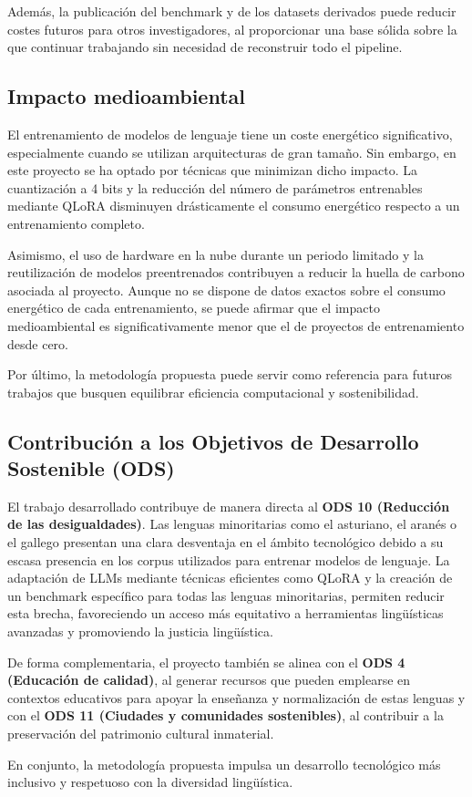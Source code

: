 Además, la publicación del benchmark y de los datasets derivados puede reducir costes futuros para otros investigadores, al proporcionar una base sólida sobre la que continuar trabajando sin necesidad de reconstruir todo el pipeline.

\subsection{Impacto medioambiental}

El entrenamiento de modelos de lenguaje tiene un coste energético significativo, especialmente cuando se utilizan arquitecturas de gran tamaño. Sin embargo, en este proyecto se ha optado por técnicas que minimizan dicho impacto. La cuantización a 4 bits y la reducción del número de parámetros entrenables mediante QLoRA disminuyen drásticamente el consumo energético respecto a un entrenamiento completo.

Asimismo, el uso de hardware en la nube durante un periodo limitado y la reutilización de modelos preentrenados contribuyen a reducir la huella de carbono asociada al proyecto. Aunque no se dispone de datos exactos sobre el consumo energético de cada entrenamiento, se puede afirmar que el impacto medioambiental es significativamente menor que el de proyectos de entrenamiento desde cero.

Por último, la metodología propuesta puede servir como referencia para futuros trabajos que busquen equilibrar eficiencia computacional y sostenibilidad.

\subsection*{Contribución a los Objetivos de Desarrollo Sostenible (ODS)}

El trabajo desarrollado contribuye de manera directa al \textbf{ODS 10 (Reducción de las desigualdades)}. Las lenguas minoritarias como el asturiano, el aranés o el gallego presentan una clara desventaja en el ámbito tecnológico debido a su escasa presencia en los corpus utilizados para entrenar modelos de lenguaje. La adaptación de LLMs mediante técnicas eficientes como QLoRA y la creación de un benchmark específico para todas las lenguas minoritarias, permiten reducir esta brecha, favoreciendo un acceso más equitativo a herramientas lingüísticas avanzadas y promoviendo la justicia lingüística.

De forma complementaria, el proyecto también se alinea con el \textbf{ODS 4 (Educación de calidad)}, al generar recursos que pueden emplearse en contextos educativos para apoyar la enseñanza y normalización de estas lenguas y con el \textbf{ODS 11 (Ciudades y comunidades sostenibles)}, al contribuir a la preservación del patrimonio cultural inmaterial.

En conjunto, la metodología propuesta impulsa un desarrollo tecnológico más inclusivo y respetuoso con la diversidad lingüística.

